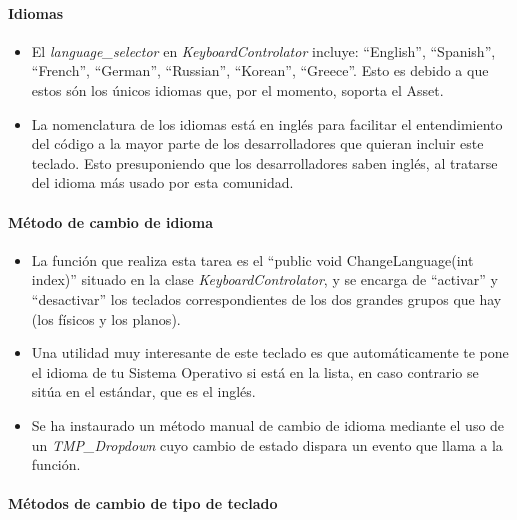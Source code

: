 \paragraph{\qquad Idiomas} 
\hfill \break %

\begin{itemize}
	\item El \textit{language\_selector} en \textit{KeyboardControlator} incluye: ``English'', ``Spanish'', ``French'', ``German'', ``Russian'', ``Korean'', ``Greece''. Esto es debido a que estos són los únicos idiomas que, por el momento, soporta el Asset.
	\item La nomenclatura de los idiomas está en inglés para facilitar el entendimiento del código a la mayor parte de los desarrolladores que quieran incluir este teclado. Esto presuponiendo que los desarrolladores saben inglés, al tratarse del idioma más usado por esta comunidad.
\end{itemize}


\paragraph{\qquad Método de cambio de idioma} 
\hfill \break %

\begin{itemize}
	\item La función que realiza esta tarea es el ``public void ChangeLanguage(int index)'' situado en la clase \textit{KeyboardControlator}, y se encarga de ``activar'' y ``desactivar'' los teclados correspondientes de los dos grandes grupos que hay (los físicos y los planos).
	\item Una utilidad muy interesante de este teclado es que automáticamente te pone el idioma de tu Sistema Operativo si está en la lista, en caso contrario se sitúa en el estándar, que es el inglés.
	\item Se ha instaurado un método manual de cambio de idioma mediante el uso de un \textit{TMP\_Dropdown} cuyo cambio de estado dispara un evento que llama a la función.
	
\end{itemize}

\paragraph{\qquad Métodos de cambio de tipo de teclado} 
\hfill \break %

